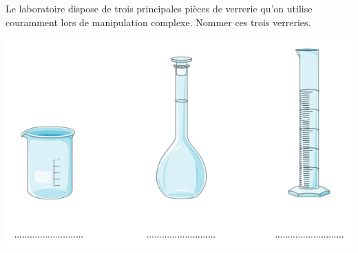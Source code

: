 \begin{tcolorbox}[colback=orange!5!white,colframe=orange!75!black,title= Scénario:]
Le laboratoire dispose de trois principales pièces de verrerie qu'on utilise couramment lors de manipulation complexe. Nommer ces trois verreries.
\begin{center}
    \includegraphics[scale=0.7]{Images/Verrerie_a_completer.png}
\end{center}
\end{tcolorbox}

